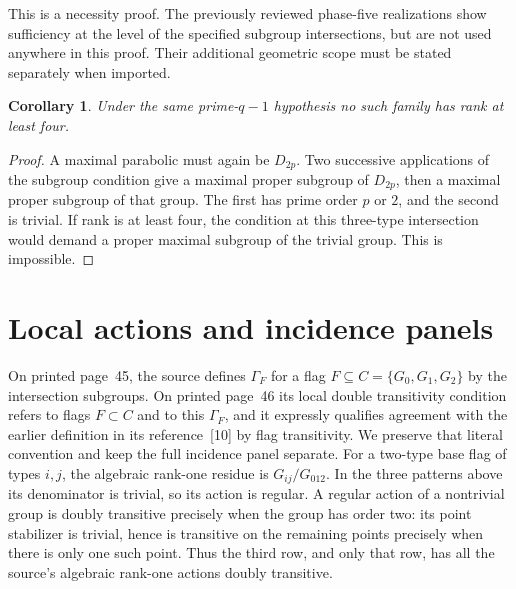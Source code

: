 \documentclass[11pt,a4paper]{article}
\newtheorem{corollary}[lemma]{Corollary}
\begin{document}
This is a necessity proof. The previously reviewed phase-five
realizations show sufficiency at the level of the specified subgroup
intersections, but are not used anywhere in this proof. Their additional
geometric scope must be stated separately when imported.

\begin{corollary}\label{rank}
Under the same prime-$q-1$ hypothesis no such family has rank at least four.
\end{corollary}
\begin{proof}
A maximal parabolic must again be $D_{2p}$. Two successive applications
of the subgroup condition give a maximal proper subgroup of $D_{2p}$,
then a maximal proper subgroup of that group. The first has prime order
$p$ or $2$, and the second is trivial. If rank is at least four,
the condition at this three-type intersection would demand a proper
maximal subgroup of the trivial group. This is impossible.
\end{proof}

\section{Local actions and incidence panels}
On printed page~45, the source defines $\Gamma_F$ for a flag
$F\subseteq C=\{G_0,G_1,G_2\}$ by the intersection subgroups.
On printed page~46 its local double transitivity condition refers to
flags $F\subset C$ and to this $\Gamma_F$, and it expressly qualifies
agreement with the earlier definition in its reference~[10] by flag
transitivity. We preserve that literal convention and keep the full
incidence panel separate. For a two-type base flag of types $i,j$,
the algebraic rank-one residue is $G_{ij}/G_{012}$.
In the three patterns above its denominator is trivial, so its action
is regular. A regular action of a nontrivial group is doubly transitive
precisely when the group has order two: its point stabilizer is trivial,
hence is transitive on the remaining points precisely when there is only
one such point. Thus the third row, and only that row, has all the
source's algebraic rank-one actions doubly transitive.
\end{document}
